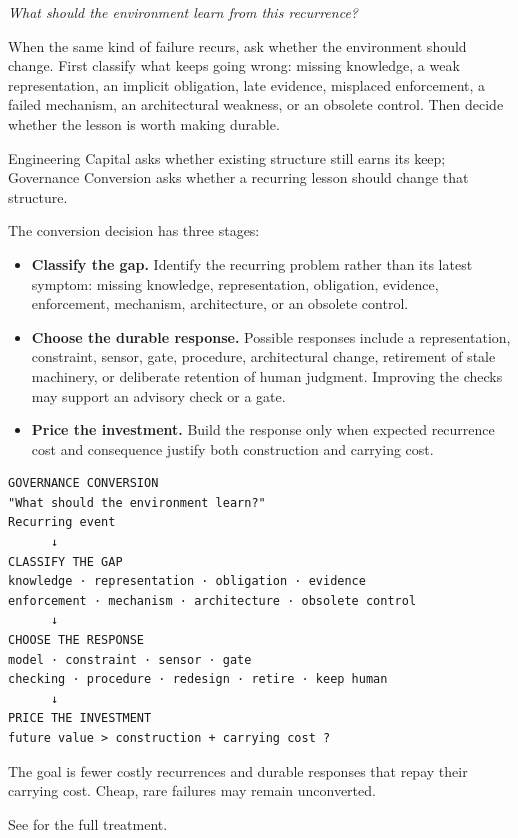 

\emph{What should the environment learn from this recurrence?}

When the same kind of failure recurs, ask whether the environment should change. First classify what keeps going wrong: missing knowledge, a weak representation, an implicit obligation, late evidence, misplaced enforcement, a failed mechanism, an architectural weakness, or an obsolete control. Then decide whether the lesson is worth making durable.

Engineering Capital asks whether existing structure still earns its keep; Governance Conversion asks whether a recurring lesson should change that structure.

The conversion decision has three stages:

\begin{itemize}
\tightlist
\item
  \textbf{Classify the gap.} Identify the recurring problem rather than its latest symptom: missing knowledge, representation, obligation, evidence, enforcement, mechanism, architecture, or an obsolete control.
\item
  \textbf{Choose the durable response.} Possible responses include a representation, constraint, sensor, gate, procedure, architectural change, retirement of stale machinery, or deliberate retention of human judgment. Improving the checks may support an advisory check or a gate.
\item
  \textbf{Price the investment.} Build the response only when expected recurrence cost and consequence justify both construction and carrying cost.
\end{itemize}

\begin{verbatim}
GOVERNANCE CONVERSION
"What should the environment learn?"
Recurring event
      ↓
CLASSIFY THE GAP
knowledge · representation · obligation · evidence
enforcement · mechanism · architecture · obsolete control
      ↓
CHOOSE THE RESPONSE
model · constraint · sensor · gate
checking · procedure · redesign · retire · keep human
      ↓
PRICE THE INVESTMENT
future value > construction + carrying cost ?
\end{verbatim}

The goal is fewer costly recurrences and durable responses that repay their carrying cost. Cheap, rare failures may remain unconverted.

See \href{3.4-governance-conversion.html}{} for the full treatment.
